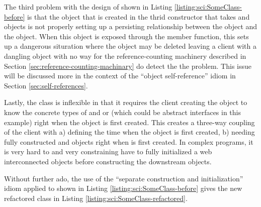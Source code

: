 \documentclass[pdf,ps2pdf,11pt]{SANDreport}
\begin{document}
The third problem with the design of {} shown in
Listing {}\ref{listing:sci:SomeClass-before} is that the {}
object that is created in the thrid constructor that takes
{} and {} objects is not properly setting up a
persisting relationship between the {} object and the
{} object.  When this {} object is exposed
through the {} member function, this sets up a
dangerous situration where the {} object may be
deleted leaving a client with a dangling {} object with
no way for the reference-counting machinery described in Section
{}\ref{sec:reference-counting-machinary} do detect the the problem.
This issue will be discussed more in the context of the ``object
self-reference'' idiom in Section {}\ref{sec:self-references}.

Lastly, the class {} is inflexible in that it
requires the client creating the {} object to know
the concrete types of {} and or {} (which could be
abstract interfaces in this example) right when the
{} object is first created.  This creates a
three-way coupling of the client with a) defining the time when the
{} object is first created, b) needing fully
constructed {} and {} objects right when
{} is first created.  In complex programs, it is
very hard to and very constraining have to fully initialized a web
interconnected objects before constructing the downstream objects.

Without further ado, the use of the ``separate construction and
initialization'' idiom applied to {} shown in
Listing {}\ref{listing:sci:SomeClass-before} gives the new refactored
class in Listing {}\ref{listing:sci:SomeClass-refactored}.
\end{document}
